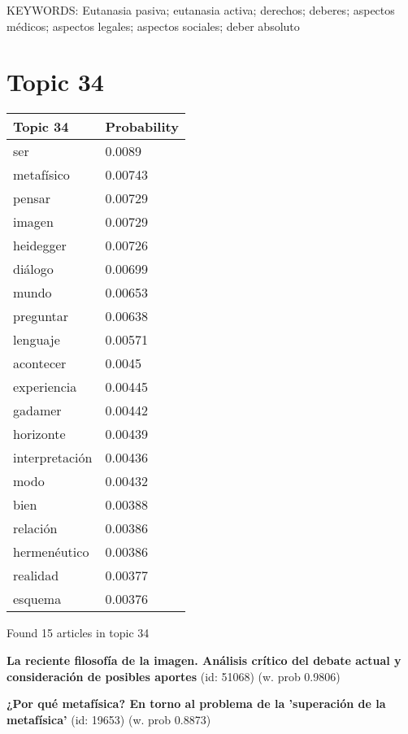 \documentclass{article}
\begin{document}
KEYWORDS:
Eutanasia pasiva; eutanasia activa; derechos; deberes; aspectos médicos; aspectos legales; aspectos sociales; deber absoluto

\vfill
\newpage


\centering
\thispagestyle{empty}
\section*{Topic 34}\vfill
\begin{tabular}{ll}
\toprule
       Topic 34 & Probability \\
\midrule
            ser &      0.0089 \\
     metafísico &     0.00743 \\
         pensar &     0.00729 \\
         imagen &     0.00729 \\
      heidegger &     0.00726 \\
        diálogo &     0.00699 \\
          mundo &     0.00653 \\
      preguntar &     0.00638 \\
       lenguaje &     0.00571 \\
      acontecer &      0.0045 \\
    experiencia &     0.00445 \\
        gadamer &     0.00442 \\
      horizonte &     0.00439 \\
 interpretación &     0.00436 \\
           modo &     0.00432 \\
           bien &     0.00388 \\
       relación &     0.00386 \\
   hermenéutico &     0.00386 \\
       realidad &     0.00377 \\
        esquema &     0.00376 \\
\bottomrule
\end{tabular}

\vfill
Found 15 articles in topic 34
\vfill

\textbf{La reciente filosofía de la imagen. Análisis crítico del debate actual y consideración de posibles aportes} (id: 51068)
 (w. prob 0.9806)
\vfill

\textbf{¿Por qué metafísica? En torno al problema de la 'superación de la metafísica'} (id: 19653)
 (w. prob 0.8873)
\end{document}
